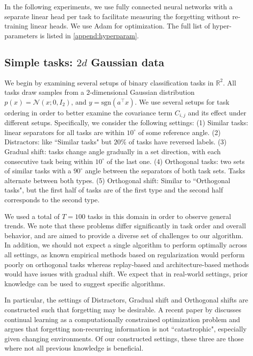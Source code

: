 \documentclass{article}
\theoremstyle{plain}
\theoremstyle{definition}
\theoremstyle{remark}
\begin{document}
In the following experiments, we use fully connected neural networks with a separate linear head per task to facilitate measuring the forgetting without re-training linear heads. We use Adam \citep{KingmaB14} for optimization. The full list of hyper-parameters is listed in \ref{append:hyperparam}. 

\subsection{Simple tasks: $2d$ Gaussian data}\label{sec:Gaussian-data}

We begin by examining several setups of binary classification tasks in $\mathbb{R}^2$. All tasks draw samples from a $2$-dimensional Gaussian distribution $p(x) = \mathcal{N}(x;0,I_2)$, and $y=\mathrm{sgn}(a^\top x)$. We use several setups for task ordering in order to better examine the covariance term $C_{i,j}$ and its effect under different setups. Specifically, we consider the following settings:
(1) Similar tasks: linear separators for all tasks are within $10^\circ$ of some reference angle.
    (2) Distractors: like ``Similar tasks" but $20\%$  of tasks have reversed labels.
    (3) Gradual shift: tasks change angle gradually in a set direction, with each consecutive task being within $10^\circ$ of the last one.
    (4) Orthogonal tasks: two sets of similar tasks with a $90^\circ$ angle between the separators of both task sets. Tasks alternate between both types.
    (5) Orthogonal shift: Similar to ``Orthogonal tasks", but the first half of tasks are of the first type and the second half corresponds to the second type.

We used a total of $T=100$ tasks in this domain in order to observe general trends.
We note that these problems differ significantly in task order and overall behavior, and are aimed to provide a diverse set of challenges to our algorithm. In addition, we should not expect a single algorithm to perform optimally across all settings, as known empirical methods based on regularization would perform poorly on orthogonal tasks whereas replay-based and architecture-based methods would have issues with gradual shift. We expect that in real-world settings, prior knowledge can be used to suggest specific algorithms.

In particular, the settings of Distractors, Gradual shift and Orthogonal shifts are constructed such that forgetting may be desirable. A recent paper by \citet{kumar2023continual} discusses continual learning as a computationally constrained optimization problem and argues that forgetting non-recurring information is not ``catastrophic", especially given changing environments. Of our constructed settings, these three are those where not all previous knowledge is beneficial.
\end{document}
